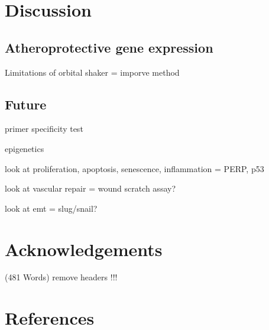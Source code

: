 \documentclass[
  12pt,
]{article}
\begin{document}
\hypertarget{discussion}{%
\section{Discussion}\label{discussion}}

\hypertarget{atheroprotective-gene-expression}{%
\subsection{Atheroprotective gene expression}\label{atheroprotective-gene-expression}}

Limitations of orbital shaker = imporve method

\hypertarget{future}{%
\subsection{Future}\label{future}}

primer specificity test

epigenetics

look at proliferation, apoptosis, senescence, inflammation = PERP, p53

look at vascular repair = wound scratch assay?

look at emt = slug/snail?

\hypertarget{acknowledgements}{%
\section{Acknowledgements}\label{acknowledgements}}

\begin{flushright}
(481 Words) remove headers !!!
\end{flushright}

\hypertarget{references}{%
\section{References}\label{references}}
\end{document}

